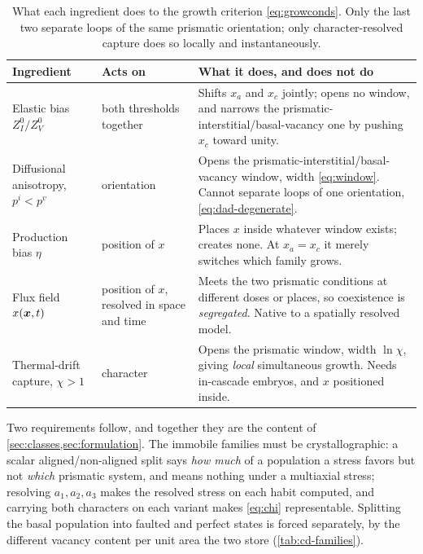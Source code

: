 \begin{table}[htbp]
\caption{What each ingredient does to the growth criterion \cref{eq:growconds}.
Only the last two separate loops of the same prismatic orientation; only
character-resolved capture does so locally and instantaneously.}
\label{tab:mechanisms}
\centering\small
\begin{tabularx}{\textwidth}{@{}>{\raggedright\arraybackslash}p{}
                              >{\raggedright\arraybackslash}p{}X@{}}
\toprule
Ingredient & Acts on & What it does, and does not do \\
\midrule
Elastic bias $Z^{0}_{I}/Z^{0}_{V}$ & both thresholds together &
  Shifts $x_a$ and $x_c$ jointly; opens no window, and narrows the
  prismatic-interstitial/basal-vacancy one by pushing $x_c$ toward unity. \\
\addlinespace
Diffusional anisotropy, $p^{i}<p^{v}$ & orientation &
  Opens the prismatic-interstitial/basal-vacancy window, width
  \cref{eq:window}. Cannot separate loops of one orientation,
  \cref{eq:dad-degenerate}. \\
\addlinespace
Production bias $\eta$ & position of $x$ &
  Places $x$ inside whatever window exists; creates none. At $x_a=x_c$ it merely
  switches which family grows. \\
\addlinespace
Flux field $x(\bm{x},t)$ & position of $x$, resolved in space and time &
  Meets the two prismatic conditions at different doses or places, so
  coexistence is \emph{segregated}. Native to a spatially resolved model. \\
\addlinespace
Thermal-drift capture, $\chi>1$ & character &
  Opens the prismatic window, width $\ln\chi$, giving \emph{local} simultaneous
  growth. Needs in-cascade embryos, and $x$ positioned inside. \\
\bottomrule
\end{tabularx}
\end{table}

Two requirements follow, and together they are the content of
\cref{sec:classes,sec:formulation}. The immobile families must be
crystallographic: a scalar aligned/non-aligned split says \emph{how much} of a
population a stress favors but not \emph{which} prismatic system, and means
nothing under a multiaxial stress; resolving $a_1,a_2,a_3$ makes the resolved
stress on each habit computed, and carrying both characters on each variant
makes \cref{eq:chi} representable. Splitting the basal population into
faulted and perfect states is forced separately, by the different vacancy
content per unit area the two store (\cref{tab:cd-families}).

